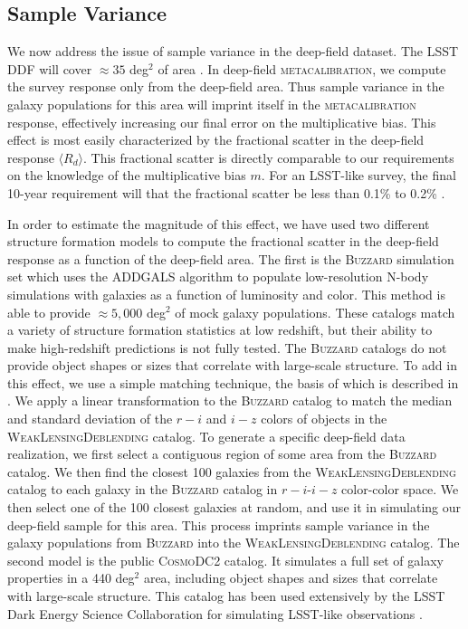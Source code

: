 \documentclass[twocolumn]{openjournal}
\makeatletter
\newcommand{\mcal}{\textsc{metacalibration}\@\xspace}
\newcommand{\descwl}{\textsc{WeakLensingDeblending}\@\xspace}
\newcommand{\cosmodctwo}{\textsc{CosmoDC2}\@\xspace}
\newcommand{\buzzard}{\textsc{Buzzard}\@\xspace}
\makeatother
\begin{document}
\subsection{Sample Variance}\label{sec:sv}

We now address the issue of sample variance in the deep-field dataset. The LSST DDF will
cover $\approx35$ deg$^2$ of area \citep{lsst-ddf-design,ivezic2019lsst}. In deep-field
\mcal, we compute the survey response only from the deep-field area. Thus sample
variance in the galaxy populations for this area will imprint itself in the \mcal
response, effectively increasing our final error on the multiplicative bias. This effect
is most easily characterized by the fractional scatter in the deep-field response
$\langle R_{d}\rangle$. This fractional scatter is directly comparable to our
requirements on the knowledge of the multiplicative bias $m$. For an LSST-like survey,
the final 10-year requirement will that the fractional scatter be less than 0.1\% to
0.2\% \citep{huterer2006,descsrd}.

In order to estimate the magnitude of this effect, we have used two different structure
formation models to compute the fractional scatter in the deep-field response as a
function of the deep-field area. The first is the \buzzard simulation set
\citep{derose2019buzzard} which uses the \textsc{ADDGALS} \citep{addgals} algorithm to
populate low-resolution N-body simulations with galaxies as a function of luminosity
and color. This method is able to provide $\approx5,000$ deg$^2$ of mock galaxy
populations. These catalogs match a variety of structure formation statistics at low
redshift, but their ability to make high-redshift predictions is not fully tested. The
\buzzard catalogs do not provide object shapes or sizes that correlate with large-scale
structure. To add in this effect, we use a simple matching technique, the basis of which
is described in \citet{galsampler}. We apply a linear transformation to the \buzzard
catalog to match the median and standard deviation of the $r-i$ and $i-z$ colors  of
objects in the \descwl catalog. To generate a specific deep-field data realization, we
first select a contiguous region of some area from the \buzzard catalog. We then find
the closest 100 galaxies from the \descwl catalog to each galaxy in the \buzzard catalog
in $r-i$-$i-z$ color-color space. We then select one of the 100 closest galaxies at
random, and use it in simulating our deep-field sample for this area. This process
imprints sample variance in the galaxy populations from \buzzard into the \descwl
catalog. The second model is the public \cosmodctwo \citep{cosmodc2} catalog. It
simulates a full set of galaxy properties in a 440 deg$^2$ area, including object shapes
and sizes that correlate with large-scale structure. This catalog has been used
extensively by the LSST Dark Energy Science Collaboration for simulating LSST-like
observations \citep{dc2,dc2note}.
\end{document}
